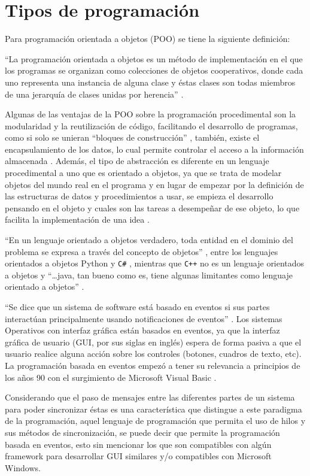 \section{Tipos de programaci\'on}

Para programaci\'on orientada a objetos (POO) se tiene la siguiente
 definici\'on:


``La programaci\'on orientada a objetos es un m\'etodo de implementaci\'on
 en el que los programas se organizan como colecciones de objetos cooperativos,
 donde cada uno representa una instancia de alguna clase y \'estas clases 
 son todas miembros de una jerarqu\'ia de clases unidas por herencia'' 
 \cite{020189551X}.


Algunas de las ventajas de la POO sobre la programaci\'on procedimental
 son la modularidad y la reutilizaci\'on de c\'odigo, facilitando el 
 desarrollo de programas, como si solo se unieran ``bloques de construcci\'on'' 
 \cite{020189551X}, tambi\'en, existe el encapsulamiento de los datos, lo 
 cual permite controlar el acceso a la informaci\'on almacenada 
 \cite{8448132467}. Adem\'as, el tipo de abstracci\'on es diferente en 
 un lenguaje procedimental a uno que es orientado a objetos, 
 ya que se trata de modelar objetos del mundo real en el programa y en 
 lugar de empezar por la definici\'on de las estructuras de datos y 
 procedimientos a usar, se empieza el desarrollo pensando en el objeto y 
 cuales son las tareas a desempe\~nar de ese objeto, lo que facilita la 
 implementaci\'on de una idea \cite{8448132467}. 


``En un lenguaje orientado a objetos verdadero, toda entidad en el dominio
 del problema se expresa a trav\'es del concepto de objetos'' 
 \cite{8448132467}, entre los lenguajes orientados a objetos Python
 \cite{MarzalVar2014} y \texttt{C\#} \cite{8448132467}, mientras que
 \texttt{C++} \cite{8448132467} no es un lenguaje orientados a objetos y 
 ``\ldots java, tan bueno como es, tiene algunas limitantes como lenguaje 
 orientado a objetos'' \cite{8448132467}.


``Se dice que un sistema de software est\'a basado en eventos si sus partes
 interact\'uan principalmente usando notificaciones de eventos'' 
 \cite{9781430201564}. Los sistemas Operativos con interfaz gr\'afica est\'an 
 basados en eventos, ya que la interfaz gr\'afica de usuario (GUI, por sus
 siglas en ingl\'es) espera de forma pasiva a que el usuario realice alguna 
 acci\'on sobre los controles \cite{9781430201564} (botones, cuadros de texto, 
 etc). La programaci\'on basada en eventos empez\'o a tener su relevancia a 
 principios de los a\~nos 90 con el surgimiento de Microsoft Visual Basic 
 \cite{9781430201564}.
 
  
Considerando que el paso de mensajes entre las diferentes partes de un sistema
 para poder sincronizar \'estas \cite{9781430201564} es una caracter\'istica 
 que distingue a este paradigma de la programaci\'on, aquel lenguaje de 
 programaci\'on que permita el uso de hilos y sus m\'etodos de 
 sincronizaci\'on, se puede decir que permite la programaci\'on basada en 
 eventos, esto sin mencionar los que son compatibles con alg\'un framework para 
 desarrollar GUI similares y/o compatibles con Microsoft Windows.


